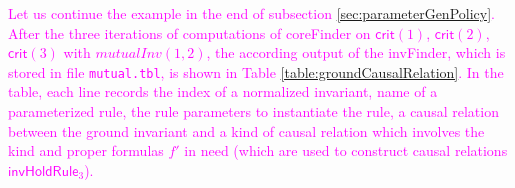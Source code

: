 \documentclass[conference]{IEEEtran}
\newcommand\lyj[1]{\textcolor{magenta}{ #1}}
\begin{document}

\lyj{Let us continue the example in the end of subsection \ref{sec:parameterGenPolicy}. After the three iterations of computations of {\sf coreFinder} on $\mathsf{crit}(1)$, $\mathsf{crit}(2)$, $\mathsf{crit}(3)$ with  $mutualInv(1,2)$, the according output of the {\sf invFinder}, which is stored in file {\tt mutual.tbl},  is shown in Table
\ref{table:groundCausalRelation}. In the table,  each line records the    index of a normalized   invariant, name of a parameterized rule, the rule
  parameters to instantiate the rule, a causal relation between
  the ground invariant and a kind of causal relation which involves the kind and proper formulas
  $f'$   in need (which are used to construct
      causal relations $\mathsf{invHoldRule}_3$).}  
\end{document}
